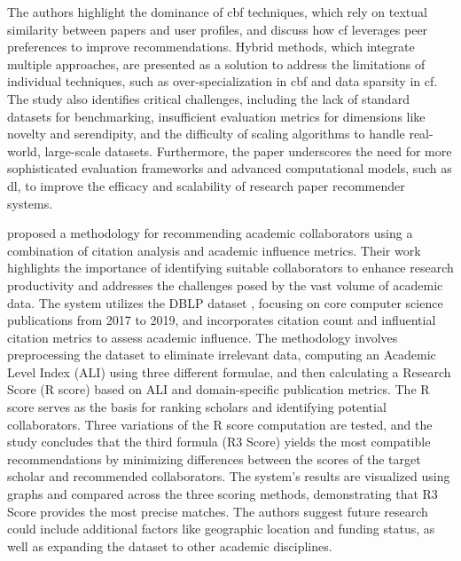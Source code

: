 The authors highlight the dominance of \gls{cbf} techniques, which rely on textual similarity between papers and user profiles, and discuss how \gls{cf} leverages peer preferences to improve recommendations.
Hybrid methods, which integrate multiple approaches, are presented as a solution to address the limitations of individual techniques, such as over-specialization in \gls{cbf} and data sparsity in \gls{cf}.
The study also identifies critical challenges, including the lack of standard datasets for benchmarking, insufficient evaluation metrics for dimensions like novelty and serendipity, and the difficulty of scaling algorithms to handle real-world, large-scale datasets.
Furthermore, the paper underscores the need for more sophisticated evaluation frameworks and advanced computational models, such as \gls{dl}, to improve the efficacy and scalability of research paper recommender systems.

\textcite{Jagadishwari2023} proposed a methodology for recommending academic collaborators using a combination of citation analysis and academic influence metrics.
Their work highlights the importance of identifying suitable collaborators to enhance research productivity and addresses the challenges posed by the vast volume of academic data.
The system utilizes the DBLP dataset \cite{Ley2002}, focusing on core computer science publications from 2017 to 2019, and incorporates citation count and influential citation metrics to assess academic influence.
The methodology involves preprocessing the dataset to eliminate irrelevant data, computing an Academic Level Index (ALI) using three different formulae, and then calculating a Research Score (R score) based on ALI and domain-specific publication metrics.
The R score serves as the basis for ranking scholars and identifying potential collaborators.
Three variations of the R score computation are tested, and the study concludes that the third formula (R3 Score) yields the most compatible recommendations by minimizing differences between the scores of the target scholar and recommended collaborators.
The system's results are visualized using graphs and compared across the three scoring methods, demonstrating that R3 Score provides the most precise matches.
The authors suggest future research could include additional factors like geographic location and funding status, as well as expanding the dataset to other academic disciplines.

